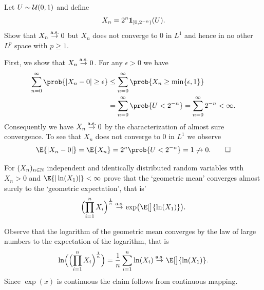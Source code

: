\documentclass[11pt]{article}
\begin{document}
\maketitle



% 


\begin{exercise}[subtitle={Almost sure but not \(L^p\) convergence}]
    \label{ex: as but not Lp}
    Let \(U\sim \mathcal{U}(0,1)\) and define
    \[
        X_n = 2^n \ind{[0, 2^{-n})}(U).
    \]
    Show that \(X_n \overset{\operatorname{\text{a.s.}}}\to 0\) but \(X_n\) does not converge to \(0\)
    in \(L^1\) and hence in no other \(L^p\) space with \(p \ge 1\).
\end{exercise}

\begin{solution}
    First, we show that \(X_n \overset{\operatorname{\text{a.s.}}}\to 0\). For any \(\epsilon > 0\)
    we have
    \[\begin{aligned}
        \sum_{n=0}^\infty \prob{\abs{X_n - 0} \ge \epsilon}
        &\le \sum_{n=0}^\infty \prob{X_n \ge \min\set{\epsilon, 1}}
        \\
        &= \sum_{n=0}^\infty\prob{U < 2^{-n}} = \sum_{n=0}^\infty 2^{-n} < \infty.
    \end{aligned}
    \]
    Consequently we have \(X_n \overset{\operatorname{\text{a.s.}}}\to 0\) by the characterization of almost sure convergence.
    To see that \(X_n\) does not converge to \(0\) in \(L^1\) we observe
    \[
        \E{\abs{X_n - 0}}
        = \E{X_n}
        = 2^n \prob{U < 2^{-n}} = 1
        \not\to 0.
        \qedhere
    \]
\end{solution}


\begin{exercise}[subtitle={Products of random variables}]
    For \((X_n)_{n\in \mathbb{N}}\) independent and identically distributed random
    variables with \(X_n > 0\) and \(\E{|\ln(X_1)|} < \infty\) prove that the
    `geometric mean' converges almost surely to the `geometric expectation',
    that is'
    \[
        \Bigl(\prod_{i=1}^n X_i \Bigr)^\frac1n
        \overset{\as}\to \exp\bigl(\E[\big]{\ln(X_1)}\bigr).
    \]
\end{exercise}

\begin{solution}
    Observe that the logarithm of the geometric mean converges by the law of
    large numbers to the expectation of the logarithm, that is
    \[
        \ln\Bigl(\Bigl(\prod_{i=1}^n X_i \Bigr)^\frac1n\Bigr)
        = \frac1n \sum_{i=1}^n \ln(X_i)
        \overset{\as}\to \E[\big]{\ln(X_1)}.
    \]
    Since \(\exp(x)\) is continuous the claim follows from continuous mapping.
\end{solution}
\end{document}
